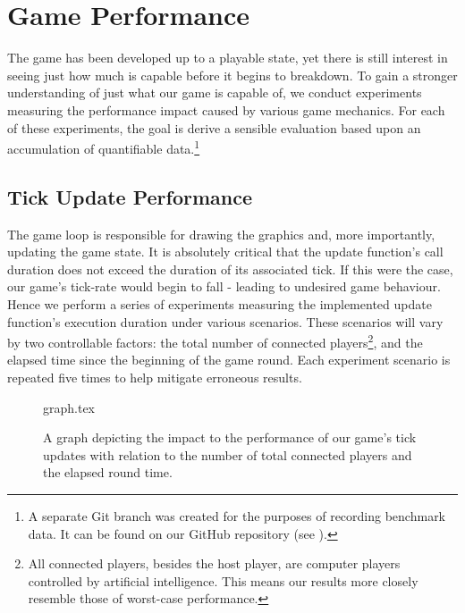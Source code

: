 \documentclass{standalone}
\begin{document}
	\section{Game Performance}
		The game has been developed up to a playable state, yet there is still interest in seeing just how much is capable before it begins to breakdown. To gain a stronger understanding of just what our game is capable of, we conduct experiments measuring the performance impact caused by various game mechanics. For each of these experiments, the goal is derive a sensible evaluation based upon an accumulation of quantifiable data.\footnote{A separate Git branch was created for the purposes of recording benchmark data. It can be found on our GitHub repository (see ).}

		\subsection{Tick Update Performance}
			The game loop is responsible for drawing the graphics and, more importantly, updating the game state. It is absolutely critical that the update function's call duration does not exceed the duration of its associated tick. If this were the case, our game's tick-rate would begin to fall - leading to undesired game behaviour. Hence we perform a series of experiments measuring the implemented update function's execution duration under various scenarios. These scenarios will vary by two controllable factors: the total number of connected players\footnote{All connected players, besides the host player, are computer players controlled by artificial intelligence. This means our results more closely resemble those of worst-case performance.}, and the elapsed time since the beginning of the game round. Each experiment scenario is repeated five times to help mitigate erroneous results.

			\begin{figure}[!htbp]
				{graph.tex}
				\captionsetup{justification=centerlast, margin=10ex, labelfont=bf, textfont=it, format=plain, labelformat=default, labelsep=endash, font=small}
				\caption{A graph depicting the impact to the performance of our game's tick updates with relation to the number of total connected players and the elapsed round time.}
			\end{figure}
\end{document}
